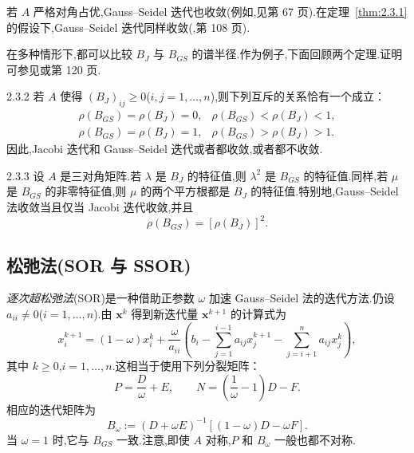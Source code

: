 若 \(A\) 严格对角占优,Gauss--Seidel 迭代也收敛(例如,见第 67 页).在定理~\ref{thm:2.3.1}的假设下,Gauss--Seidel 迭代同样收敛(,第 108 页).

在多种情形下,都可以比较 \(B_J\) 与 \(B_{GS}\) 的谱半径.作为例子,下面回顾两个定理.证明可参见或第 120 页.

\begin{theorem}{2.3.2}
若 \(A\) 使得 \((B_J)_{ij}\ge0\)(\(i,j=1,\ldots,n\)),则下列互斥的关系恰有一个成立：
\begin{equation}\label{eq:2.3.9}
  \begin{array}{ll}
    \rho(B_{GS})=\rho(B_J)=0,& \rho(B_{GS})<\rho(B_J)<1,\\
    \rho(B_{GS})=\rho(B_J)=1,& \rho(B_{GS})>\rho(B_J)>1.
  \end{array}
\end{equation}
因此,Jacobi 迭代和 Gauss--Seidel 迭代或者都收敛,或者都不收敛.
\end{theorem}

\begin{theorem}[]{2.3.3}
设 \(A\) 是三对角矩阵.若 \(\lambda\) 是 \(B_J\) 的特征值,则 \(\lambda^2\) 是 \(B_{GS}\) 的特征值.同样,若 \(\mu\) 是 \(B_{GS}\) 的非零特征值,则 \(\mu\) 的两个平方根都是 \(B_J\) 的特征值.特别地,Gauss--Seidel 法收敛当且仅当 Jacobi 迭代收敛,并且
\begin{equation}\label{eq:2.3.10}
  \rho(B_{GS})=[\rho(B_J)]^2.
\end{equation}
\end{theorem}

\subsection{松弛法(SOR 与 SSOR)}\label{sec:2.3.3}

\emph{逐次超松弛法}(SOR)是一种借助正参数 \(\omega\) 加速 Gauss--Seidel 法的迭代方法.仍设 \(a_{ii}\ne0\)(\(i=1,\ldots,n\)).由 \(\boldsymbol{x}^k\) 得到新迭代量 \(\boldsymbol{x}^{k+1}\) 的计算式为
\begin{equation}\label{eq:2.3.11}
  x_i^{k+1}=(1-\omega)x_i^k+\frac{\omega}{a_{ii}}
  \left(b_i-\sum_{j=1}^{i-1}a_{ij}x_j^{k+1}-\sum_{j=i+1}^na_{ij}x_j^k\right),
\end{equation}
其中 \(k\ge0\),\(i=1,\ldots,n\).这相当于使用下列分裂矩阵：
\begin{equation}\label{eq:2.3.12}
  P=\frac D\omega+E,\qquad
  N=\left(\frac1\omega-1\right)D-F.
\end{equation}
相应的迭代矩阵为
\begin{equation}\label{eq:2.3.13}
  B_\omega:=(D+\omega E)^{-1}[(1-\omega)D-\omega F].
\end{equation}
当 \(\omega=1\) 时,它与 \(B_{GS}\) 一致.注意,即使 \(A\) 对称,\(P\) 和 \(B_\omega\) 一般也都不对称.

